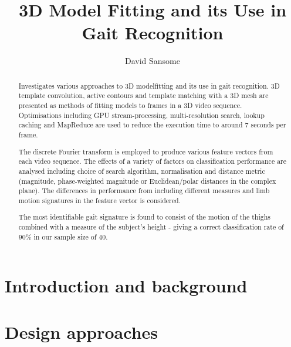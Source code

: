\documentclass[a4paper,11pt]{report}
\title{3D Model Fitting and its Use in Gait Recognition}
\author{David Sansome}
\begin{document}


\maketitle

\begin{abstract}
	Investigates various approaches to 3D modelfitting and its use in gait recognition.
	3D template convolution, active contours and template matching with a 3D mesh are presented as methods of fitting models to frames in a 3D video sequence.
	Optimisations including GPU stream-processing, multi-resolution search, lookup caching and MapReduce are used to reduce the execution time to around 7 seconds per frame.
	
	The discrete Fourier transform is employed to produce various feature vectors from each video sequence.
	The effects of a variety of factors on classification performance are analysed including choice of search algorithm, normalisation and distance metric (magnitude, phase-weighted magnitude or Euclidean/polar distances in the complex plane).
	The differences in performance from including different measures and limb motion signatures in the feature vector is considered.
	
	The most identifiable gait signature is found to consist of the motion of the thighs combined with a measure of the subject's height - giving a correct classification rate of 90\% in our sample size of 40.
\end{abstract}

\newpage

\tableofcontents

\chapter{Introduction and background}

\clearpage
\clearpage


\chapter{Design approaches}

\clearpage
\clearpage
\clearpage
\clearpage
\clearpage
\clearpage
\clearpage

\end{document}
